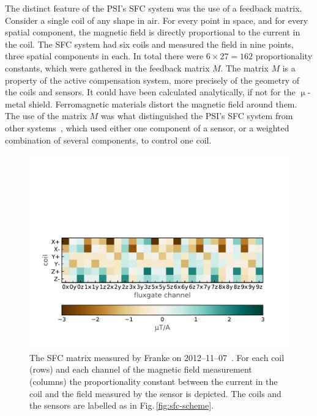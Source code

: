 
The distinct feature of the PSI's SFC system was the use of a feedback matrix. Consider a single coil of any shape in air. For every point in space, and for every spatial component, the magnetic field is directly proportional to the current in the coil. The SFC system had six coils and measured the field in nine points, three spatial components in each. In total there were $6 \times 27 = 162$ proportionality constants, which were gathered in the feedback matrix $M$. The matrix $M$ is a property of the active compensation system, more precisely of the geometry of the coils and sensors. It could have been calculated analytically, if not for the $\upmu$-metal shield. Ferromagnetic materials distort the magnetic field around them. The use of the matrix $M$ was what distinguished the PSI's SFC system from other systems~\cite{Kelha1982,Brake1991,Spemann2003,Brys2005,Kobayashi2012,Voigt2013}, which used either one component of a sensor, or a weighted combination of several components, to control one coil.



\begin{figure}
  \centering
  \includegraphics[width=.8\linewidth]{gfx/nEDM_SFC/nEDM_SFC_matrix.pdf}
  \caption{The SFC matrix measured by Franke on 2012--11--07~\cite{Franke2013}. For each coil (rows) and each channel of the magnetic field measurement (columns) the proportionality constant between the current in the coil and the field measured by the sensor is depicted. The coils and the sensors are labelled as in Fig.\,\ref{fig:sfc-scheme}.}\label{fig:nEDM_SFC_matrix}
\end{figure}

